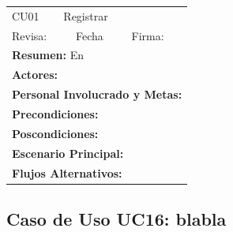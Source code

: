 \begin{longtable}{|l|p{5.5cm}|l|p{2cm}|l|p{1.9cm}|} \hline
    \cellcolor{grisOscuro} CU01 & \multicolumn{4}{|l|}{  \cellcolor{grisOscuro} Registrar} &  \cellcolor{grisClaro}\multirow{2}{1cm}{} \\ \cline{1-5}
    \cellcolor{grisOscuro} Revisa: &  \cellcolor{grisClaro} &  \cellcolor{grisOscuro} Fecha &  \cellcolor{grisClaro} &  \cellcolor{grisOscuro} Firma: & \cellcolor{grisClaro} \\ \hline
    \multicolumn{6}{|p{15cm}|}{ \textbf{Resumen: } En

    } \\ \hline

    \multicolumn{6}{|p{15cm}|}{ \textbf{Actores: }

    } \\ \hline

    \multicolumn{6}{|p{15cm}|}{ \textbf{Personal Involucrado y Metas: }

    } \\ \hline

    \multicolumn{6}{|p{15cm}|}{ \textbf{Precondiciones: }

    } \\ \hline

    \multicolumn{6}{|p{15cm}|}{ \textbf{Poscondiciones: }

    } \\ \hline

    \multicolumn{6}{|p{15cm}|}{ \textbf{Escenario Principal: }

    } \\ \hline

    \multicolumn{6}{|p{15cm}|}{ \textbf{Flujos Alternativos: }

    } \\ \hline

\end{longtable}


\subsection{Caso de Uso UC16: blabla}

